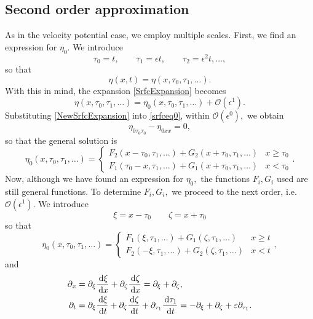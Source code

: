\documentclass[10pt,reqno,oneside,a4paper, landscape]{article}
\begin{document}
\subsection{Second order approximation}
As in the velocity potential case, we employ multiple scales. First, we find an expression for $\eta_0.$  We introduce 
\[ \tau_0 = t, \qquad \tau_1 = \epsilon t, \qquad \tau_2 = \epsilon^2 t, \ldots, \]
so that 
\[ \eta(x, t) = \eta(x, \tau_0, \tau_1, \ldots). \]
With this in mind, the expansion \eqref{SrfcExpansion} becomes
\begin{equation}\label{NewSrfcExpansion}
\eta(x, \tau_0, \tau_1, \ldots) = \eta_0(x, \tau_0, \tau_1, \ldots) + \mathcal{O}(\epsilon^1).
\end{equation}
Substituting \eqref{NewSrfcExpansion} into \eqref{srfceq0}, within $\mathcal{O}(\epsilon^0),$ we obtain
\begin{equation}\label{1stOrderApprox}
\eta_{0\tau_0 \tau_0} - \eta_{0xx} = 0,
\end{equation}
so that the general solution is 
\[ \eta_0(x, \tau_0, \tau_1, \ldots ) = \begin{cases} F_2(x-\tau_0, \tau_1, \ldots ) + G_2(x+\tau_0, \tau_1, \ldots) & x\geq \tau_0 \\ F_1(\tau_0-x, \tau_1, \ldots ) + G_1(x+\tau_0, \tau_1, \ldots) & x<\tau_0 \end{cases}. \]
Now, although we have found an expression for $\eta_0,$ the functions $F_i, G_i$ used are still general functions. To determine $F_i,G_i,$ we proceed to the next order, i.e. $\mathcal{O}(\epsilon^1).$ We introduce
\[ 
\xi = x-\tau_0 \qquad \zeta = x+ \tau_0
\]
so that 
\[ \eta_0(x, \tau_0, \tau_1, \ldots ) = \begin{cases} F_1(\xi, \tau_1, \ldots ) + G_1(\zeta, \tau_1, \ldots) & x\geq t \\ F_2(-\xi, \tau_1, \ldots ) + G_2(\zeta, \tau_1, \ldots) & x<t \end{cases}, \]
and
\begin{align*}
\partial_x &= \partial_\xi \frac{\,\mathrm{d} \xi}{\,\mathrm{d} x} + \partial_\zeta \frac{\,\mathrm{d} \zeta}{\,\mathrm{d} x} =\partial_\xi + \partial_\zeta, \\
\partial_t &= \partial_\xi \frac{\,\mathrm{d} \xi}{\,\mathrm{d} t} + \partial_\zeta \frac{\,\mathrm{d} \zeta}{\,\mathrm{d} t} + \partial_{\tau_1}\frac{\,\mathrm{d} \tau_1}{\,\mathrm{d} t} = - \partial_\xi + \partial_\zeta + \varepsilon \partial_{\tau_1}.
\end{align*}

\end{document}
